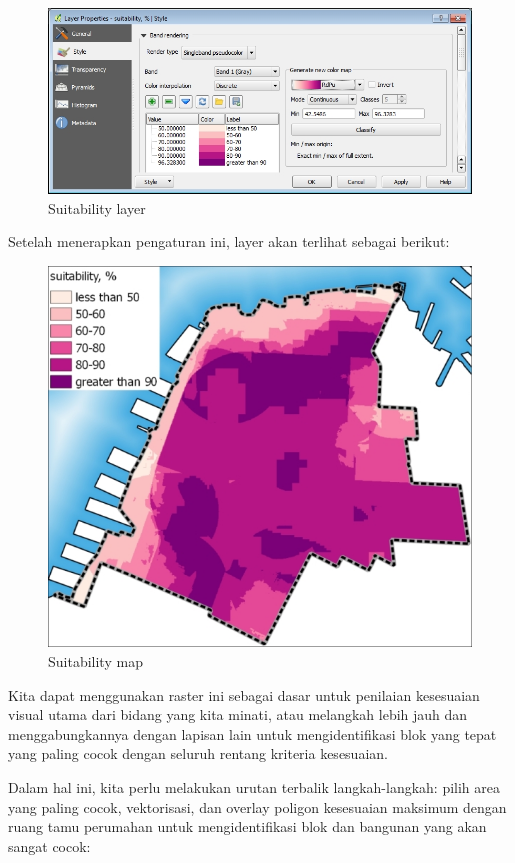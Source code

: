 \documentclass[]{book}
\begin{document}
\begin{figure}

{\centering \includegraphics[width=0.7\linewidth]{images/04/fig41} 

}

\caption{Suitability layer}\label{fig:fig1441}
\end{figure}

Setelah menerapkan pengaturan ini, layer akan terlihat sebagai berikut:

\begin{figure}

{\centering \includegraphics[width=0.7\linewidth]{images/04/fig42} 

}

\caption{Suitability map}\label{fig:fig1442}
\end{figure}

Kita dapat menggunakan raster ini sebagai dasar untuk penilaian kesesuaian visual utama dari bidang yang kita minati, atau melangkah lebih jauh dan menggabungkannya dengan lapisan lain untuk mengidentifikasi blok yang tepat yang paling cocok dengan seluruh rentang kriteria kesesuaian.

Dalam hal ini, kita perlu melakukan urutan terbalik langkah-langkah: pilih area yang paling cocok, vektorisasi, dan overlay poligon kesesuaian maksimum dengan ruang tamu perumahan untuk mengidentifikasi blok dan bangunan yang akan sangat cocok:
\end{document}
